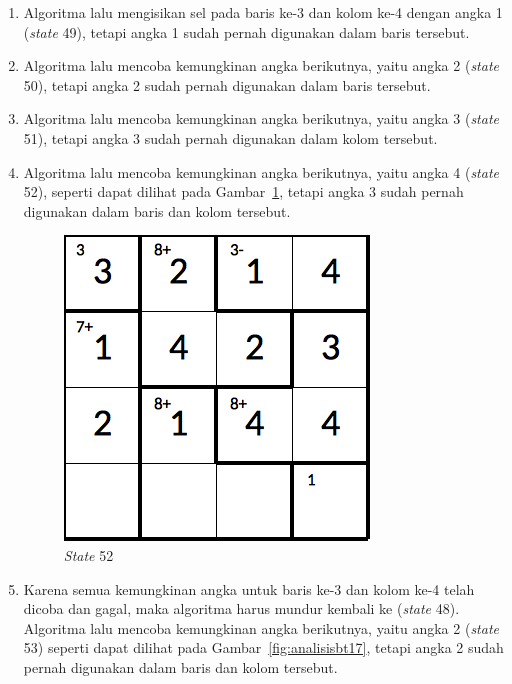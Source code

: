 \begin{enumerate}
\item Algoritma lalu mengisikan sel pada baris ke-3 dan kolom ke-4 dengan angka 1 (\textit{state} 49), tetapi angka 1 sudah pernah digunakan dalam baris tersebut.
\item Algoritma lalu mencoba kemungkinan angka berikutnya, yaitu angka 2 (\textit{state} 50), tetapi angka 2 sudah pernah digunakan dalam baris tersebut.
\item Algoritma lalu mencoba kemungkinan angka berikutnya, yaitu angka 3 (\textit{state} 51), tetapi angka 3 sudah pernah digunakan dalam kolom tersebut.
\item Algoritma lalu mencoba kemungkinan angka berikutnya, yaitu angka 4 (\textit{state} 52), seperti dapat dilihat pada Gambar~\ref{fig:analisisbt16}, tetapi angka 3 sudah pernah digunakan dalam baris dan kolom tersebut.

\begin{figure}
\centering
\captionsetup{justification=centering}
\includegraphics[scale=0.333]{Gambar/backtracking/State52}
\caption[\textit{State} 52]{\textit{State} 52}
\label{fig:analisisbt16}
\end{figure}

\item Karena semua kemungkinan angka untuk baris ke-3 dan kolom ke-4 telah dicoba dan gagal, maka algoritma harus mundur kembali ke (\textit{state} 48). Algoritma lalu mencoba kemungkinan angka berikutnya, yaitu angka 2 (\textit{state} 53) seperti dapat dilihat pada Gambar~\ref{fig:analisisbt17}, tetapi angka 2 sudah pernah digunakan dalam baris dan kolom tersebut.


\end{enumerate}
